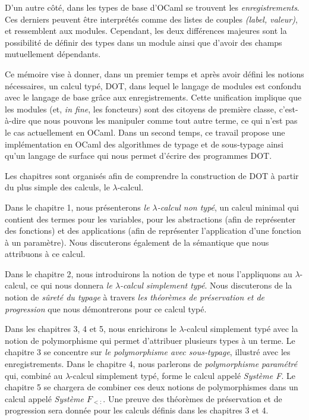 D'un autre côté, dans les types de base d'OCaml se trouvent les
\textit{enregistrements}. Ces derniers peuvent être interprétés comme des listes
de couples \textit{(label, valeur)}, et ressemblent aux modules. Cependant, les deux
différences majeures sont la possibilité de définir des types dans un
module ainsi que d'avoir des champs mutuellement dépendants.

Ce mémoire vise à donner, dans un premier temps et après avoir défini les notions
nécessaires, un calcul typé, DOT\cite{WF-DOT-2016}, dans lequel le
langage de modules est confondu avec le langage de base grâce aux
enregistrements. Cette unification implique
que les modules (et, \textit{in fine}, les foncteurs) sont des citoyens de première
classe, c'est-à-dire que nous pouvons les manipuler comme tout autre terme, ce qui
n'est pas le cas actuellement en OCaml.
Dans un second temps, ce travail propose une implémentation en OCaml
des algorithmes de typage et de sous-typage ainsi qu'un langage de surface qui nous
permet d'écrire des programmes DOT.


Les chapitres sont organisés afin de comprendre la construction de DOT
à partir du plus simple des calculs, le $\lambda$-calcul.

Dans le chapitre 1, nous présenterons \textit{le $\lambda$-calcul non typé}, un calcul
minimal qui contient des termes pour les variables, pour les abstractions (afin
de représenter des fonctions) et des applications (afin de représenter
l'application d'une fonction à un paramètre). Nous discuterons également de la
sémantique que nous attribuons à ce calcul.

Dans le chapitre 2, nous introduirons la notion de type et nous l'appliquons au
$\lambda$-calcul, ce qui nous donnera \textit{le $\lambda$-calcul simplement typé}. Nous
discuterons de la notion de \textit{sûreté du typage} à travers \textit{les théorèmes
de préservation et de progression} que nous démontrerons pour ce calcul typé.

Dans les chapitres 3, 4 et 5, nous enrichirons le $\lambda$-calcul simplement
typé avec la notion de polymorphisme qui permet d'attribuer plusieurs types à un
terme. Le chapitre 3 se concentre sur \textit{le polymorphisme avec sous-typage},
illustré avec les enregistrements.
Dans le chapitre 4, nous parlerons de
\textit{polymorphisme paramétré} qui, combiné au $\lambda$-calcul simplement typé, forme
le calcul appelé \textit{Système F}.
Le chapitre 5 se chargera de combiner ces deux notions de polymorphismes dans un
calcul appelé \textit{Système $F_{<:}$}.
Une preuve des théorèmes de préservation et de progression sera donnée pour
les calculs définis dans les chapitres 3 et 4.

